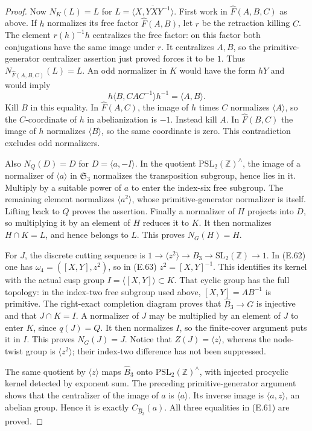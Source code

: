 \begin{proof}
Now $N_K(L)=L$ for
$L=\overline{\langle X,YXY^{-1}\rangle}$.
First work in $\widehat F(A,B,C)$ as above.
If $h$ normalizes its free factor $\widehat F(A,B)$,
let $r$ be the retraction killing $C$.
The element $r(h)^{-1}h$ centralizes the free
factor: on this factor both conjugations have
the same image under $r$.  It centralizes $A,B$,
so the primitive-generator centralizer assertion
just proved forces it to be $1$.
Thus $N_{\widehat F(A,B,C)}(L)=L$.
An odd normalizer in $K$ would have the form
$hY$ and would imply
\[
 h\langle B,CAC^{-1}\rangle h^{-1}=\langle A,B\rangle.
\]
Kill $B$ in this equality.  In $\widehat F(A,C)$,
the image of $h$ times $C$ normalizes
$\langle A\rangle$, so the $C$-coordinate of
$h$ in abelianization is $-1$.
Instead kill $A$.  In $\widehat F(B,C)$ the
image of $h$ normalizes $\langle B\rangle$, so
the same coordinate is zero.  This contradiction
excludes odd normalizers.

Also $N_Q(D)=D$ for $D=\langle a,-I\rangle$.
In the quotient $\mathrm{PSL}_2(\mathbb Z)^{\wedge}$,
the image of a normalizer of $\langle a\rangle$
in $\mathfrak S_3$ normalizes the transposition
subgroup, hence lies in it.  Multiply by a
suitable power of $a$ to enter the index-six
free subgroup.  The remaining element normalizes
$\langle a^2\rangle$, whose primitive-generator
normalizer is itself.  Lifting back to $Q$
proves the assertion.  Finally a normalizer of
$H$ projects into $D$, so multiplying it by an
element of $H$ reduces it to $K$.  It then
normalizes $H\cap K=L$, and hence belongs to
$L$.  This proves $N_G(H)=H$.

For $J$, the discrete cutting sequence is
$1\to\langle z^2\rangle\to B_3\to
\mathrm{SL}_2(\mathbb Z)\to1$.
In (E.62) one has
$\omega _4=([X,Y],z^2)$, so in (E.63)
$z^2=[X,Y]^{-1}$.  This identifies its kernel
with the actual cusp group
$I=\langle[X,Y]\rangle\subset K$.
That cyclic group has the full topology: in the
index-two free subgroup used above,
$[X,Y]=AB^{-1}$ is primitive.  The right-exact
completion diagram proves that
$\widehat B_3\to G$ is injective and that
$J\cap K=I$.  A normalizer of $J$ may be
multiplied by an element of $J$ to enter $K$,
since $q(J)=Q$.  It then normalizes $I$, so
the finite-cover argument puts it in $I$.
This proves $N_G(J)=J$.
Notice that $Z(J)=\langle z\rangle$, whereas
the node-twist group is $\langle z^2\rangle$;
their index-two difference has not been suppressed.

The same quotient by $\langle z\rangle$ maps
$\widehat B_3$ onto
$\mathrm{PSL}_2(\mathbb Z)^{\wedge}$, with
injected procyclic kernel detected by exponent
sum.  The preceding primitive-generator argument
shows that the centralizer of the image of $a$
is $\langle a\rangle$.  Its inverse image is
$\langle a,z\rangle$, an abelian group.  Hence
it is exactly $C_{\widehat B_3}(a)$.
All three equalities in (E.61) are proved.
\end{proof}


